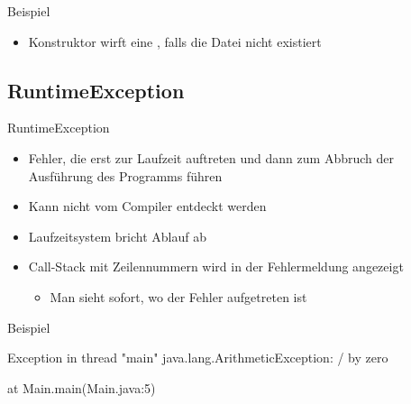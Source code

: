 \documentclass{../tuda-beamer}
\begin{document}
    \begin{frame}{Beispiel}
        \begin{itemize}
            \item {} Konstruktor wirft eine , falls
            die Datei nicht existiert
        \end{itemize}

        
    \end{frame}

    \subsection{RuntimeException}
    \label{subsec:runtime-exception}
    \begin{frame}[c]{RuntimeException}
        \begin{itemize}
            \item Fehler, die erst zur Laufzeit auftreten und dann zum Abbruch der Ausführung des
            Programms führen
            \item Kann nicht vom Compiler entdeckt werden
            \item Laufzeitsystem bricht Ablauf ab
            \item Call-Stack mit Zeilennummern wird in der Fehlermeldung angezeigt
            \begin{itemize}
                \item Man sieht sofort, wo der Fehler aufgetreten ist
            \end{itemize}
        \end{itemize}
    \end{frame}

    \begin{frame}[c]{Beispiel}
        

        \begin{tcolorbox}
            \textcolor{TUDa-9c}{Exception in thread "main"{} java.lang.ArithmeticException: / by
            zero}

            \hspace{1cm}\textcolor{TUDa-9c}{at Main.main(Main.java:5)}
        \end{tcolorbox}
    \end{frame}
\end{document}
